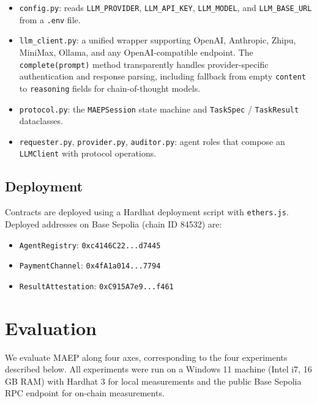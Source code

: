 \documentclass[conference]{IEEEtran}
\begin{document}
\begin{itemize}
\item \texttt{config.py}: reads \texttt{LLM\_PROVIDER},
  \texttt{LLM\_API\_KEY}, \texttt{LLM\_MODEL}, and
  \texttt{LLM\_BASE\_URL} from a \texttt{.env} file.

\item \texttt{llm\_client.py}: a unified wrapper supporting OpenAI,
  Anthropic, Zhipu, MiniMax, Ollama, and any OpenAI-compatible
  endpoint.  The \texttt{complete(prompt)} method transparently
  handles provider-specific authentication and response parsing,
  including fallback from empty \texttt{content} to \texttt{reasoning}
  fields for chain-of-thought models.

\item \texttt{protocol.py}: the \texttt{MAEPSession} state machine and
  \texttt{TaskSpec} / \texttt{TaskResult} dataclasses.

\item \texttt{requester.py}, \texttt{provider.py},
  \texttt{auditor.py}: agent roles that compose an
  \texttt{LLMClient} with protocol operations.
\end{itemize}

\subsection{Deployment}

Contracts are deployed using a Hardhat deployment script with
\texttt{ethers.js}.  Deployed addresses on Base Sepolia (chain ID
84532) are:

\begin{itemize}
\item \texttt{AgentRegistry}: \texttt{0xc4146C22...d7445}
\item \texttt{PaymentChannel}: \texttt{0x4fA1a014...7794}
\item \texttt{ResultAttestation}: \texttt{0xC915A7e9...f461}
\end{itemize}

\section{Evaluation}
\label{sec:evaluation}

We evaluate MAEP along four axes, corresponding to the four
experiments described below.  All experiments were run on a Windows 11
machine (Intel i7, 16 GB RAM) with Hardhat 3 for local measurements
and the public Base Sepolia RPC endpoint for on-chain measurements.
\end{document}
